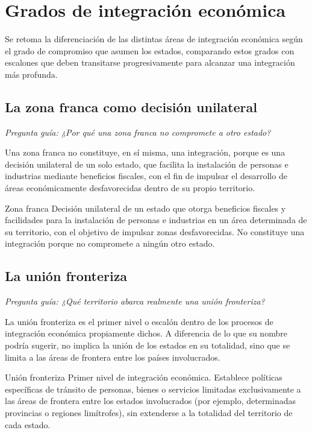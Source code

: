 \documentclass[12pt,oneside]{book}
\begin{document}
\chapter{Grados de integración económica}

Se retoma la diferenciación de las distintas áreas de integración económica según el grado de compromiso que asumen los estados, comparando estos grados con escalones que deben transitarse progresivamente para alcanzar una integración más profunda.

\section{La zona franca como decisión unilateral}

\textit{Pregunta guía: ¿Por qué una zona franca no compromete a otro estado?}

Una zona franca no constituye, en sí misma, una integración, porque es una decisión unilateral de un solo estado, que facilita la instalación de personas e industrias mediante beneficios fiscales, con el fin de impulsar el desarrollo de áreas económicamente desfavorecidas dentro de su propio territorio.

\begin{definition}{Zona franca}
Decisión unilateral de un estado que otorga beneficios fiscales y facilidades para la instalación de personas e industrias en un área determinada de su territorio, con el objetivo de impulsar zonas desfavorecidas. No constituye una integración porque no compromete a ningún otro estado.
\end{definition}

\section{La unión fronteriza}

\textit{Pregunta guía: ¿Qué territorio abarca realmente una unión fronteriza?}

La unión fronteriza es el primer nivel o escalón dentro de los procesos de integración económica propiamente dichos. A diferencia de lo que su nombre podría sugerir, no implica la unión de los estados en su totalidad, sino que se limita a las áreas de frontera entre los países involucrados.

\begin{definition}{Unión fronteriza}
Primer nivel de integración económica. Establece políticas específicas de tránsito de personas, bienes o servicios limitadas exclusivamente a las áreas de frontera entre los estados involucrados (por ejemplo, determinadas provincias o regiones limítrofes), sin extenderse a la totalidad del territorio de cada estado.
\end{definition}
\end{document}
